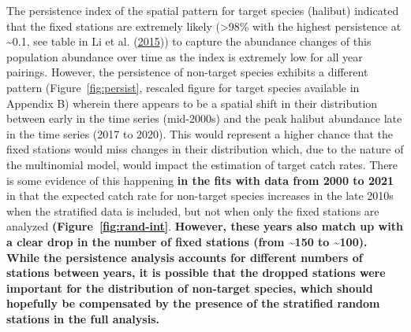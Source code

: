 \documentclass[12pt]{article}\usepackage[]{graphicx}\usepackage[]{color}
\begin{document}
The persistence index of the spatial pattern for target species (halibut) indicated that the fixed stations are extremely likely (\textgreater98\% with the highest persistence at \textasciitilde0.1, see table in Li et al. (\protect\hyperlink{ref-Li2015}{2015})) to capture the abundance changes of this population abundance over time as the index is extremely low for all year pairings. However, the persistence of non-target species exhibits a different pattern (Figure~\ref{fig:persist}, rescaled figure for target species available in Appendix B) wherein there appears to be a spatial shift in their distribution between early in the time series (mid-2000s) and the peak halibut abundance late in the time series (2017 to 2020). This would represent a higher chance that the fixed stations would miss changes in their distribution which, due to the nature of the multinomial model, would impact the estimation of target catch rates. There is some evidence of this happening \textbf{in the fits with data from 2000 to 2021} in that the expected catch rate for non-target species increases in the late 2010s when the stratified data is included, but not when only the fixed stations are analyzed \textbf{(Figure~\ref{fig:rand-int}}. \textbf{However, these years also match up with a clear drop in the number of fixed stations (from \textasciitilde150 to \textasciitilde100). While the persistence analysis accounts for different numbers of stations between years, it is possible that the dropped stations were important for the distribution of non-target species, which should hopefully be compensated by the presence of the stratified random stations in the full analysis.}
\end{document}
